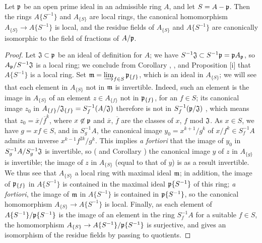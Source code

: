 \begin{prop}[7.6.17]
\label{0.7.6.17}
Let $\mathfrak{p}$ be an open prime ideal in an admissible ring $A$, and let $S=A-\mathfrak{p}$.
Then the rings $A\{S^{-1}\}$ and $A_{\{S\}}$ are local rings, the canonical homomorphism
$A_{\{S\}}\to A\{S^{-1}\}$ is local, and the residue fields of $A_{\{S\}}$ and $A\{S^{-1}\}$ are
canonically isomorphic to the field of fractions of $A/\mathfrak{p}$.
\end{prop}

\begin{proof}
\label{proof-0.7.6.17}
Let $\mathfrak{J}\subset\mathfrak{p}$ be an ideal of definition for $A$; we have
$S^{-1}\mathfrak{J}\subset S^{-1}\mathfrak{p}=\mathfrak{p}A_\mathfrak{p}$, so
$A_\mathfrak{p}/S^{-1}\mathfrak{J}$ is a local ring; we conclude from 
Corollary , , and
Proposition [i] that $A\{S^{-1}\}$ is a local ring. Set
$\mathfrak{m}=\varinjlim_{f\in S}\mathfrak{p}_{\{f\}}$, which is an ideal in $A_{\{S\}}$; we
will see that each element in $A_{\{S\}}$ not in $\mathfrak{m}$ is invertible. Indeed, such an
element is the image in $A_{\{S\}}$ of an element $z\in A_{\{f\}}$ not in $\mathfrak{p}_{\{f\}}$,
for an $f\in S$; its canonical image $z_0$ in
$A_{\{f\}}/\mathfrak{J}_{\{f\}}=S_f^{-1}(A/\mathfrak{J})$ therefore is not in
$S_f^{-1}(\mathfrak{p}/\mathfrak{J})$ , which means that
$z_0=\overline{x}/\overline{f}^k$, where $x\not\in\mathfrak{p}$ and $\overline{x}$, $\overline{f}$
are the classes of $x$, $f$ mod $\mathfrak{J}$. As $x\in S$, we have $g=xf\in S$, and in
$S_g^{-1}A$, the canonical image $y_0=x^{k+1}/g^k$ of $x/f^k\in S_f^{-1}A$ admits an inverse
$x^{k-1}f^{2k}/g^k$. This implies {\em a fortiori} that the image of $y_0$ in
$S_g^{-1}A/S_g^{-1}\mathfrak{J}$ is invertible, so ( and
Corollary ) the canonical image $y$ of $z$ in $A_{\{g\}}$ is
invertible; the image of $z$ in $A_{\{S\}}$ (equal to that of $y$) is as a result invertible.
We thus see that $A_{\{S\}}$ a local ring with maximal ideal $\mathfrak{m}$; in addition, the image
of $\mathfrak{p}_{\{f\}}$ in $A\{S^{-1}\}$ is contained in the maximal ideal $\mathfrak{p}\{S^{-1}\}$
of this ring; {\em a fortiori}, the image of $\mathfrak{m}$ in $A\{S^{-1}\}$ is contained in
$\mathfrak{p}\{S^{-1}\}$, so the canonical homomorphism $A_{\{S\}}\to A\{S^{-1}\}$ is local. Finally,
as each element of $A\{S^{-1}\}/\mathfrak{p}\{S^{-1}\}$ is the image of an element in the ring
$S_f^{-1}A$ for a suitable $f\in S$, the homomorphism $A_{\{S\}}\to A\{S^{-1}\}/\mathfrak{p}\{S^{-1}\}$
is surjective, and gives an isomorphism of the residue fields by passing to quotients.
\end{proof}

